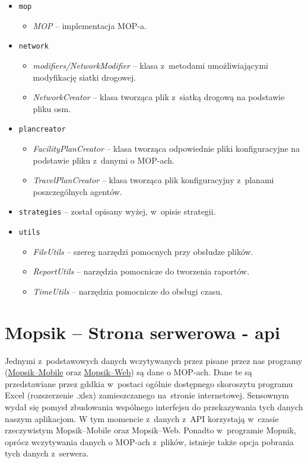 \begin{itemize}
\begin{itemize}
        \end{itemize}
    \item \texttt{mop}
        \begin{itemize}
            \item \textit{MOP} -- implementacja MOP-a.
        \end{itemize}
    \item \texttt{network}
        \begin{itemize}
            \item \textit{modifiers/NetworkModifier} -- klasa z~metodami umożliwiającymi modyfikację siatki drogowej.
            \item \textit{NetworkCreator} -- klasa tworząca plik z~siatką drogową na podstawie pliku osm.
        \end{itemize}
    \item \texttt{plancreator}
        \begin{itemize}
            \item \textit{FacilityPlanCreator} -- klasa tworząca odpowiednie pliki konfiguracyjne na podstawie pliku z~danymi o MOP-ach.
            \item \textit{TravelPlanCreator} -- klasa tworząca plik konfiguracyjny z~planami poszczególnych agentów.
        \end{itemize}
    \item \texttt{strategies} -- został opisany wyżej, w~opisie strategii.
    \item \texttt{utils}
        \begin{itemize}
            \item \textit{FileUtils} -- szereg narzędzi pomocnych przy obsłudze plików.
            \item \textit{ReportUtils} -- narzędzia pomocnicze do tworzenia raportów.
            \item \textit{TimeUtils} -- narzędzia pomocnicze do obsługi czasu.
        \end{itemize}        
    
\end{itemize}


\chapter{Mopsik -- Strona serwerowa - \acrshort{api}}
\label{mopsik_api}

Jednymi z~podstawowych danych wczytywanych przez pisane przez nas programy (\hyperref[mopsik_mobile]{Mopsik--Mobile} oraz \hyperref[mopsik_web]{Mopsik--Web}) są dane o MOP-ach. Dane te są przedstawiane przez \acrshort{gddkia} w~postaci ogólnie dostępnego skoroszytu programu Excel (rozszerzenie .xlsx) zamieszczanego na~stronie internetowej\cite{mop-gddkia}.
Sensownym wydał się pomysł zbudowania wspólnego interfejsu do przekazywania tych danych naszym aplikacjom. W tym momencie z~danych z~API korzystają w~czasie rzeczywistym Mopsik--Mobile oraz Mopsik--Web. Ponadto w~programie Mopnik, oprócz wczytywania danych o MOP-ach z~plików, istnieje także opcja pobrania tych danych z~serwera.

